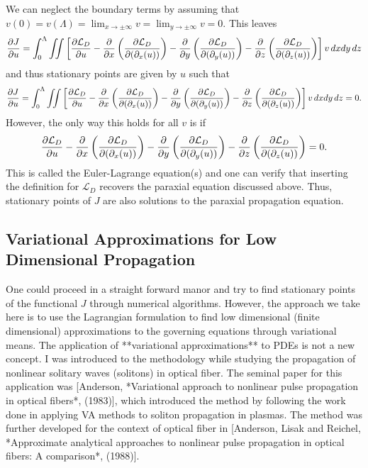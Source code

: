 We can neglect the boundary terms by assuming that $v(0) = v(\Lambda) = \lim_{x\to\pm\infty}v =\lim_{y\to\pm\infty}v =0$.  This leaves 
\begin{equation}
    \frac{\partial J}{\partial u} = \int_{0}^{\Lambda} \iint \left[\frac{\partial \mathcal{L}_{D}}{\partial u}  - \frac{\partial }{\partial x}\left(\frac{\partial \mathcal{L}_{D}}{\partial (\partial_{x}(u))}\right)
    -\frac{\partial }{\partial y}\left(\frac{\partial \mathcal{L}_{D}}{\partial (\partial_{y}(u))}\right)
    -\frac{\partial }{\partial z}\left(\frac{\partial \mathcal{L}_{D}}{\partial (\partial_{z}(u))}\right)\right] v \,dx dy \, dz 
\end{equation}
and thus stationary points are given by $u$ such that 
\begin{equation}
    \frac{\partial J}{\partial u} = \int_{0}^{\Lambda} \iint \left[\frac{\partial \mathcal{L}_{D}}{\partial u}  - \frac{\partial }{\partial x}\left(\frac{\partial \mathcal{L}_{D}}{\partial (\partial_{x}(u))}\right)
    -\frac{\partial }{\partial y}\left(\frac{\partial \mathcal{L}_{D}}{\partial (\partial_{y}(u))}\right)
    -\frac{\partial }{\partial z}\left(\frac{\partial \mathcal{L}_{D}}{\partial (\partial_{z}(u))}\right)\right] v \,dx dy \, dz = 0.
\end{equation}
However, the only way this holds for all $v$ is if 
\begin{equation}
    \frac{\partial \mathcal{L}_{D}}{\partial u}  - \frac{\partial }{\partial x}\left(\frac{\partial \mathcal{L}_{D}}{\partial (\partial_{x}(u))}\right)
    -\frac{\partial }{\partial y}\left(\frac{\partial \mathcal{L}_{D}}{\partial (\partial_{y}(u))}\right)
    -\frac{\partial }{\partial z}\left(\frac{\partial \mathcal{L}_{D}}{\partial (\partial_{z}(u))}\right) = 0.
\end{equation}
This is called the Euler-Lagrange equation(s) and one can verify that inserting the definition for $\mathcal{L}_{D}$ recovers the paraxial equation discussed above.  Thus, stationary points of $J$ are also solutions to the paraxial propagation equation.


\subsection{Variational Approximations for Low Dimensional Propagation}

One could proceed in a straight forward manor and try to find stationary points of the functional $J$ through numerical algorithms.  However, the approach we take here is to use the Lagrangian formulation to find low dimensional (finite dimensional) approximations to the governing equations through variational means.  The application of **variational approximations** to PDEs is not a new concept.  I was introduced to the methodology while studying the propagation of nonlinear solitary waves (solitons) in optical fiber.  The seminal paper for this application was [Anderson, *Variational approach to nonlinear pulse propagation in optical fibers*, (1983)], which introduced the method by following the work done in applying VA methods to soliton propagation in plasmas.  The method was further developed for the context of optical fiber in [Anderson, Lisak and Reichel, *Approximate analytical approaches to nonlinear pulse propagation in optical fibers: A comparison*, (1988)].  

